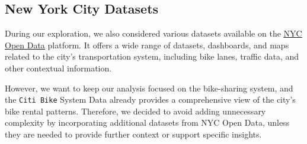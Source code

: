 \subsection{New York City Datasets}
During our exploration, we also considered various datasets available on the \href{https://opendata.cityofnewyork.us/}{\underline{NYC Open Data}} platform.
It offers a wide range of datasets, dashboards, and maps related to the city's transportation system, including bike lanes, traffic data, and other contextual information.

However, we want to keep our analysis focused on the bike-sharing system, and the \texttt{Citi Bike} System Data already provides a comprehensive view of the city's bike rental patterns.
Therefore, we decided to avoid adding unnecessary complexity by incorporating additional datasets from NYC Open Data, unless they are needed to provide further context or support specific insights.